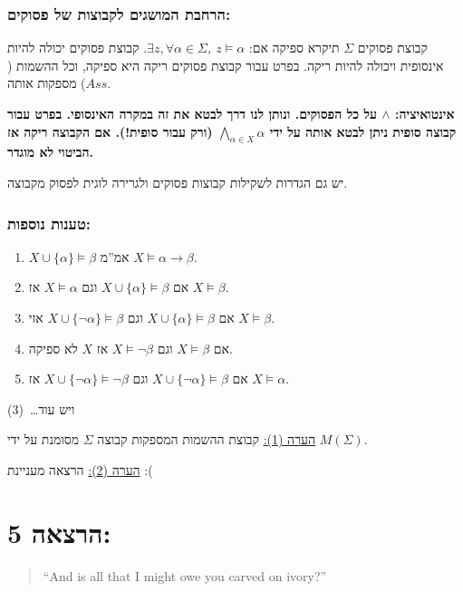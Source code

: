 \documentclass[12pt,a4paper]{article}
\begin{document}
\subsubsection*{הרחבת המושגים לקבוצות של פסוקים:}

קבוצת פסוקים $\Sigma$ תיקרא ספיקה אם: $\exists z,\forall\alpha\in\Sigma,\ z\vDash\alpha$. קבוצת פסוקים יכולה להיות אינסופית ויכולה להיות ריקה. בפרט עבור קבוצת פסוקים ריקה היא ספיקה, וכל ההשמות ($Ass$) מספקות אותה.

\textbf{אינטואיציה: $\land$ על כל הפסוקים. ונותן לנו דרך לבטא את זה במקרה האינסופי. בפרט עבור קבוצה סופית ניתן לבטא אותה על ידי $\underset{\alpha\in X}{\bigwedge}\alpha$ (ורק עבור סופית!). אם הקבוצה ריקה אז הביטוי לא מוגדר.}

יש גם הגדרות לשקילות קבוצות פסוקים ולגרירה לוגית לפסוק מקבוצה.

\subsubsection*{טענות נוספות:}

\begin{enumerate}
  \item $X\cup\{\alpha\}\vDash\beta$ אמ''מ $X\vDash\alpha\rightarrow\beta$.
  \item אם $X\cup\{\alpha\}\vDash\beta$ וגם $X\vDash\alpha$ אז $X\vDash\beta$.
  \item אם $X\cup\{\alpha\}\vDash\beta$ וגם $X\cup\{\lnot\alpha\}\vDash\beta$ אזי $X\vDash\beta$.
  \item אם $X\vDash\beta$ וגם $X\vDash\lnot\beta$ אז $X$ לא ספיקה.
  \item אם $X\cup\{\lnot\alpha\}\vDash\beta$ וגם $X\cup\{\lnot\alpha\}\vDash\lnot\beta$ אז $X\vDash\alpha$.
\end{enumerate}

ויש עוד\ldots\ (3)

\underline{הערה (1):} קבוצת ההשמות המספקות קבוצה $\Sigma$ מסומנת על ידי $M(\Sigma)$.

\underline{הערה (2):} הרצאה מעניינת :(

\section*{הרצאה 5:}

\begin{quote}
\textenglish{``And is all that I might owe you carved on ivory?''}
\end{quote}
\end{document}
